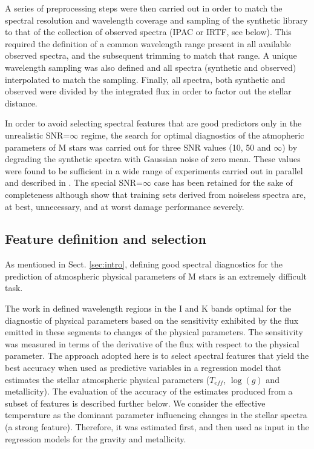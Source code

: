 A series of preprocessing steps were then carried out in order to
match the spectral resolution and wavelength coverage and sampling of
the synthetic library to that of the collection of observed spectra
(IPAC or IRTF, see below). This required the definition of a common
wavelength range present in all available observed spectra, and the
subsequent trimming to match that range. A unique wavelength sampling
was also defined and all spectra (synthetic and observed) interpolated
to match the sampling. Finally, all spectra, both synthetic and
observed were divided by the integrated flux in order to factor out
the stellar distance.

In order to avoid selecting spectral features that are good predictors
only in the unrealistic SNR=$\infty$ regime, the search for optimal
diagnostics of the atmopheric parameters of M stars was carried out
for three SNR values (10, 50 and $\infty$) by degrading the synthetic
spectra with Gaussian noise of zero mean. These values were found to
be sufficient in a wide range of experiments carried out in parallel
and described in \cite{2017MNRAS.465.4556G}. The special SNR=$\infty$
case has been retained for the sake of completeness
although \cite{2017MNRAS.465.4556G} show that training sets derived
from noiseless spectra are, at best, unnecessary, and at worst damage
performance severely.

\subsection{Feature definition and selection}
\label{subsec:FD}

As mentioned in Sect. \ref{sec:intro}, defining good spectral
diagnostics for the prediction of atmospheric physical parameters of M
stars is an extremely difficult task.

The work in \cite{cesetti} defined wavelength regions in the I and K
bands optimal for the diagnostic of physical parameters based on the
sensitivity exhibited by the flux emitted in these segments to changes
of the physical parameters. The sensitivity was measured in terms of
the derivative of the flux with respect to the physical parameter. The
approach adopted here is to select spectral features that yield the
best accuracy when used as predictive variables in a regression model
that estimates the stellar atmospheric physical parameters ($T_{eff}$,
$\log(g)$ and metallicity). The evaluation of the accuracy of the
estimates produced from a subset of features is described further
below. 
We consider the effective temperature as the dominant parameter
influencing changes in the stellar spectra (a strong feature). Therefore,
it was estimated first, and then used as input in the regression
models for the gravity and metallicity.

